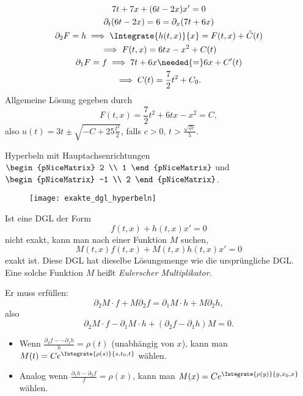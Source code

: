 \begin{beispiel*}
  \begin{gather*}
    7t+7x+(6t-2x)x'=0\\
    \partial_t (6t-2x)=6=\partial_x (7t+6x)\\
    \partial_2 F=h\implies \Integrate{h(t,x)}{x}=F(t,x)+\tilde{C}(t)\\
    \implies F(t,x)=6tx-x^2+C(t)\\
    \partial_1 F=f\implies 7t+6x\needed{=}6x+C'(t)\\
    \implies C(t)=\frac{7}{2}t^2+C_0.
  \end{gather*}
  Allgemeine Lösung gegeben durch
  \begin{equation*}
    F(t,x)=\frac{7}{2}t^2+6tx-x^2=C,
  \end{equation*}
  also \( u(t)=3t\pm \sqrt{-C+25\frac{t^2}{2}} \), falls \( c>0 \), \( t>\frac{\sqrt{2c}}{5} \).

  Hyperbeln mit Hauptachsenrichtungen \( \begin{pNiceMatrix} 2 \\ 1 \end{pNiceMatrix} \) und \( \begin{pNiceMatrix} -1 \\ 2 \end{pNiceMatrix} \).
  \begin{figure}[H]
    \centering
    \texttt{[image: exakte\_dgl\_hyperbeln]}
    \label{fig:exakte_dgl_hyperbeln}
  \end{figure}
\end{beispiel*}
\begin{bemerkung*}
  Ist eine DGL der Form
  \begin{equation*}
    f(t,x)+h(t,x)x'=0
  \end{equation*}
  nicht exakt, kann man nach einer Funktion \( M \) suchen, \sd 
  \begin{equation*}
    M(t,x)f(t,x)+M(t,x)h(t,x)x'=0
  \end{equation*}
  exakt ist. Diese DGL hat dieselbe Lösungsmenge wie die ursprüngliche DGL\@. Eine solche Funktion \( M \) heißt \emph{Eulerscher Multiplikator}.

  Er muss erfüllen:
  \begin{equation*}
    \partial_2 M \cdot f+ M \partial_2 f=\partial_1 M\cdot h+M\partial_2 h,
  \end{equation*}
  also
  \begin{equation*}
    \partial_2 M\cdot f- \partial_1 M\cdot h+(\partial_2 f- \partial_1 h)M=0.
  \end{equation*}
\end{bemerkung*}
\begin{beispiele*}
  \begin{itemize}
    \item Wenn \( \frac{\partial_2 f --\partial_1 h}{h}=\rho(t) \) (unabhängig von \( x \)), kann man \( M(t)=Ce^{\Integrate{\rho(s)}{s,t_0,t}} \) wählen.
    \item Analog wenn \( \frac{\partial_1 h-\partial_2 f}{f}=\rho(x) \), kann man \( M(x)=Ce^{\Integrate{\rho(y)}{y,x_0,x}} \) wählen.
  \end{itemize}
\end{beispiele*}
